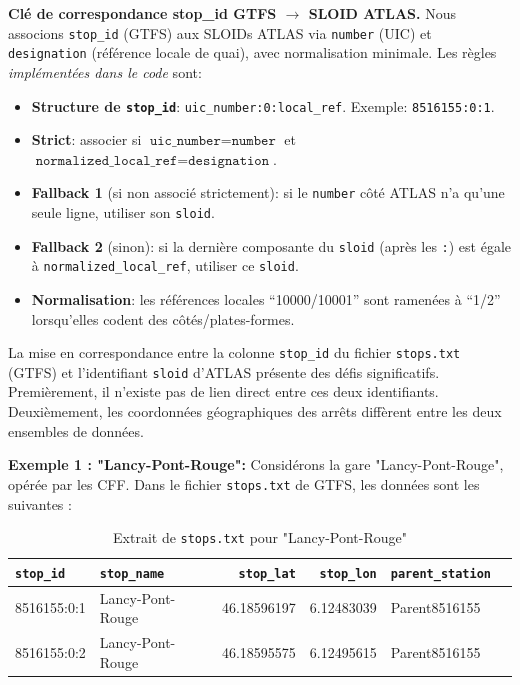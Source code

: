 \medskip
\noindent\textbf{Clé de correspondance stop\_id GTFS \(\to\) SLOID ATLAS.} Nous associons \texttt{stop\_id} (GTFS) aux SLOIDs ATLAS via \texttt{number} (UIC) et \texttt{designation} (référence locale de quai), avec normalisation minimale. Les règles \emph{implémentées dans le code} sont:
\begin{itemize}
  \item \textbf{Structure de \texttt{stop\_id}}: \texttt{uic\_number:0:local\_ref}. Exemple: \texttt{8516155:0:1}.
  \item \textbf{Strict}: associer si \(\texttt{uic\_number} = \texttt{number}\) et \(\texttt{normalized\_local\_ref} = \texttt{designation}\).
  \item \textbf{Fallback 1} (si non associé strictement): si le \texttt{number} côté ATLAS n’a qu’une seule ligne, utiliser son \texttt{sloid}.
  \item \textbf{Fallback 2} (sinon): si la dernière composante du \texttt{sloid} (après les \texttt{:}) est égale à \texttt{normalized\_local\_ref}, utiliser ce \texttt{sloid}.
  \item \textbf{Normalisation}: les références locales \enquote{10000/10001} sont ramenées à \enquote{1/2} lorsqu’elles codent des côtés/plates-formes.
\end{itemize}

La mise en correspondance entre la colonne \texttt{stop\_id} du fichier \texttt{stops.txt} (GTFS) et l’identifiant \texttt{sloid} d’ATLAS présente des défis significatifs. Premièrement, il n’existe pas de lien direct entre ces deux identifiants. Deuxièmement, les coordonnées géographiques des arrêts diffèrent entre les deux ensembles de données.

\textbf{Exemple 1 : "Lancy-Pont-Rouge":}
\newline
Considérons la gare "Lancy-Pont-Rouge", opérée par les CFF. Dans le fichier \texttt{stops.txt} de GTFS, les données sont les suivantes :

\begin{table}[H]
\caption{Extrait de \texttt{stops.txt} pour "Lancy-Pont-Rouge"}
\label{tab:stops_lancy_2}
\centering
\begin{tabular}{l l r r l l}
\toprule
\texttt{stop\_id} & \texttt{stop\_name} & \texttt{stop\_lat} & \texttt{stop\_lon} & \texttt{parent\_station} \\
\midrule
8516155:0:1 & Lancy-Pont-Rouge & 46.18596197 & 6.12483039 & Parent8516155 \\
8516155:0:2 & Lancy-Pont-Rouge & 46.18595575 & 6.12495615 & Parent8516155 \\
\bottomrule
\end{tabular}
\end{table}

